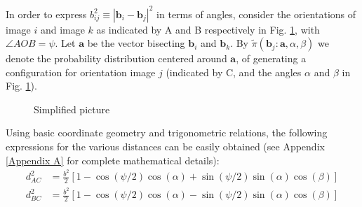         In order to express $b^2_{ij} \equiv |{\mathbf b}_i - {\mathbf b}_{j}|^2$ in terms of angles, consider the orientations of image $i$ and image $k$ as indicated by A and B respectively in Fig. \ref{fig:simple}, with $\angle AOB = \psi$. Let $\mathbf a$ be the vector bisecting ${\mathbf b}_i$ and  ${\mathbf b}_k$. By $\tilde \pi({\mathbf b}_j: \mathbf{a}, \alpha, \beta)$ we denote the probability distribution centered around $\mathbf a$, of generating a configuration for orientation image $j$ (indicated by C, and the angles $\alpha$ and $\beta$ in Fig. \ref{fig:simple}).
        \begin{figure}[!htbp]
            \centering
            \def\svgwidth{0.25\columnwidth}
            
            \caption{Simplified picture}
            \label{fig:simple}
        \end{figure}
        Using basic coordinate geometry and trigonometric relations, the following expressions for the various distances can be easily obtained (see Appendix \ref{Appendix A} for complete mathematical details):
        \begin{equation}
        \label{eq:deltax}
            \begin{aligned}
                d_{AC}^2 &= \frac{b^2}{2} [1 - \cos(\psi/2) \cos(\alpha) + \sin(\psi/2) \sin(\alpha) \cos(\beta)]\\
                d_{BC}^2 &= \frac{b^2}{2} [1 - \cos(\psi/2) \cos(\alpha) - \sin(\psi/2) \sin(\alpha) \cos(\beta)]
            \end{aligned}
        \end{equation}

